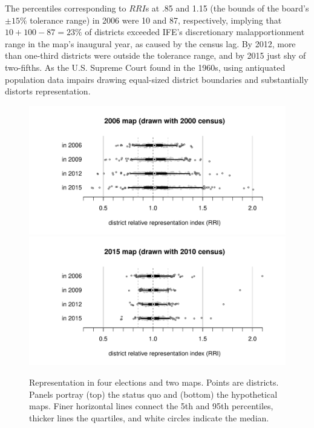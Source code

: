 \documentclass[letter,12pt]{article}
\begin{document}
{The percentiles corresponding to $RRI$s at .85 and 1.15 (the bounds of the board's $\pm15\%$ tolerance range) in 2006 were 10 and 87, respectively, implying that $10+100-87=23\%$ of districts exceeded IFE's discretionary malapportionment range in the map's inaugural year, as caused by the census lag. By 2012, more than one-third districts were outside the tolerance range, and by 2015 just shy of two-fifths. As the U.S. Supreme Court found in the 1960s, using antiquated population data impairs drawing equal-sized district boundaries and substantially distorts representation. 

\begin{figure}
\begin{center}
    \includegraphics[width=.65\columnwidth]{rrin0615d0.pdf} \\
    \includegraphics[width=.65\columnwidth]{rrin0615d3.pdf} \\
\caption{Representation in four elections and two maps. Points are districts. Panels portray (top) the status quo and (bottom) the hypothetical maps. Finer horizontal lines connect the 5th and 95th percentiles, thicker lines the quartiles, and white circles indicate the median.}\label{F:malapp}
\end{center}
\end{figure}

}
\end{document}
